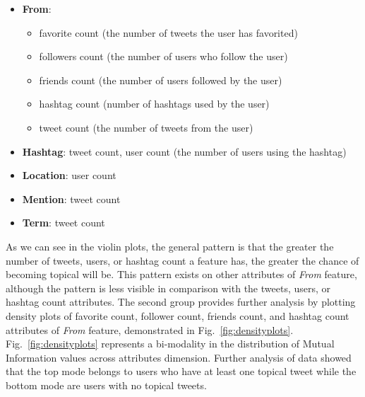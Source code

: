 \begin{itemize}
\item \textbf{From}: 
\begin{itemize}
\item favorite count (the number of tweets the user has favorited)
\item followers count (the number of users who follow the user)
\item friends count (the number of users followed by the user)
\item hashtag count (number of hashtags used by the user)
\item tweet count (the number of tweets from the user)
 \end{itemize}
\item \textbf{Hashtag}: tweet count, user count (the number of users using the hashtag)
\item \textbf{Location}: user count
\item \textbf{Mention}: tweet count
\item \textbf{Term}: tweet count
\end{itemize}

As we can see in the violin plots, the general pattern is that the greater the number of tweets, users, or hashtag count a feature has, the greater the chance of becoming topical will be. This pattern exists on other attributes of \textit{From} feature, although the pattern is less visible in comparison with the tweets, users, or hashtag count attributes. 
The second group provides further analysis by plotting density plots of favorite count, follower count, friends count, and hashtag count attributes of \textit{From} feature, demonstrated in Fig.~\ref{fig:densityplots}. Fig.~\ref{fig:densityplots} represents a bi-modality in the distribution of Mutual Information values across attributes dimension. Further analysis of data showed that the top mode belongs to users who have at least one topical tweet while the bottom mode are users with no topical tweets.

